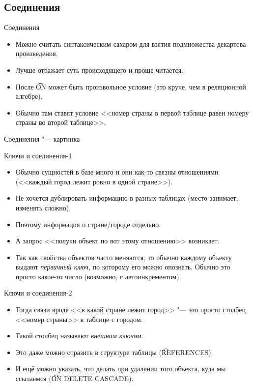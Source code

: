 \subsection{Соединения}

\begin{frame}{Соединения}
	\begin{itemize}
		\item Можно считать синтаксическим сахаром для взятия подмножества декартова произведения.
		\item Лучше отражает суть происходящего и проще читается.
		\item После \t{ON} может быть произвольное условие (это круче, чем в реляционной алгебре).
		\item Обычно там ставят условие <<номер страны в первой таблице равен номеру страны во второй таблице>>.
	\end{itemize}
\end{frame}

\begin{frame}[fragile]{Соединения "--- картинка}
\end{frame}

\begin{frame}{Ключи и соединения-1}
	\begin{itemize}
		\item Обычно сущностей в базе много и они как-то связны отношениями (<<каждый город лежит ровно в одной стране>>).
		\item Не хочется дублировать информацию в разных таблицах (место занимает, изменять сложно).
		\item Поэтому информация о стране/городе отдельно.
		\item А запрос <<получи объект по вот этому отношению>> возникает.
		\item
			Так как свойства объектов часто меняются, то обычно каждому объекту выдают \textit{первичный ключ},
			по которому его можно опознать.
			Обычно это просто какое-то число (возможно, с автоинкрементом).
	\end{itemize}
\end{frame}

\begin{frame}{Ключи и соединения-2}
	\begin{itemize}
		\item Тогда связи вроде <<в какой стране лежит город>> "--- это просто столбец <<номер страны>> в таблице с городом.
		\item Такой столбец называют \textit{внешним ключом}.
		\item Это даже можно отразить в структуре таблицы (\t{REFERENCES}).
		\item И ещё можно указать, что делать при удалении того объекта, куда мы ссылаемся (\t{ON DELETE CASCADE}).
	\end{itemize}
\end{frame}

